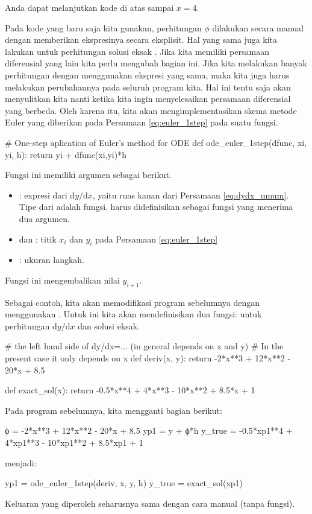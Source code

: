 Anda dapat melanjutkan kode di atas sampai $x=4$.


Pada kode yang baru saja kita gunakan, perhitungan $\phi$ dilakukan secara
manual dengan memberikan ekspresinya secara eksplisit. Hal yang sama juga
kita lakukan untuk perhitungan solusi eksak .
Jika kita memiliki
persamaan diferensial yang lain kita perlu mengubah bagian ini. Jika kita melakukan
banyak perhitungan dengan menggunakan ekspresi yang sama, maka kita juga harus melakukan
perubahannya pada seluruh program kita.
Hal ini tentu saja akan menyulitkan kita nanti ketika kita ingin menyelesaikan
persamaan diferensial yang berbeda.
Oleh karena itu, kita akan mengimplementasikan skema metode Euler yang diberikan pada
Persamaan \eqref{eq:euler_1step} pada suatu fungsi.
\begin{pythoncode}
# One-step aplication of Euler's method for ODE
def ode_euler_1step(dfunc, xi, yi, h):
    return yi + dfunc(xi,yi)*h
\end{pythoncode}
Fungsi ini memiliki argumen sebagai berikut.
\begin{itemize}
\item {}: expresi dari $\mathrm{d}y/\mathrm{d}x$, yaitu ruas kanan
dari Persamaan \eqref{eq:dydx_umum}. Tipe dari  adalah fungsi.
 harus didefinisikan sebagai fungsi yang menerima dua argumen.
\item {} dan : titik $x_{i}$ dan $y_{i}$ pada
Persamaan \eqref{eq:euler_1step}
\item {}: ukuran langkah.
\end{itemize}
Fungsi ini mengembalikan nilai $y_{i+1}$.

Sebagai contoh, kita akan memodifikasi program sebelumnya dengan menggunakan
.
Untuk ini kita akan mendefinisikan dua fungsi: untuk perhitungan
$\mathrm{d}y/\mathrm{d}x$ dan solusi eksak.
\begin{pythoncode}
# the left hand side of dy/dx=... (in general depends on x and y)
# In the present case it only depends on x
def deriv(x, y):
    return -2*x**3 + 12*x**2 - 20*x + 8.5

def exact_sol(x):
    return -0.5*x**4 + 4*x**3 - 10*x**2 + 8.5*x + 1
\end{pythoncode}

Pada program sebelumnya, kita mengganti bagian berikut:
\begin{pythoncode}
ϕ = -2*x**3 + 12*x**2 - 20*x + 8.5
yp1 = y + ϕ*h
y_true = -0.5*xp1**4 + 4*xp1**3 - 10*xp1**2 + 8.5*xp1 + 1
\end{pythoncode}
menjadi:
\begin{pythoncode}
yp1 = ode_euler_1step(deriv, x, y, h)
y_true = exact_sol(xp1)
\end{pythoncode}
Keluaran yang diperoleh seharusnya sama dengan cara manual (tanpa fungsi).


